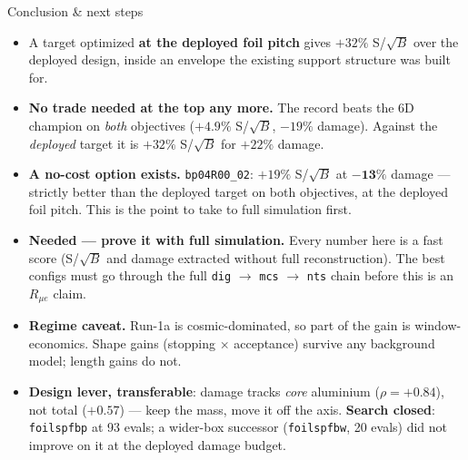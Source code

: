\documentclass[aspectratio=169,10pt]{beamer}
\begin{document}
\begin{frame}{Conclusion \& next steps}
\small
\begin{itemize}
  \item A target optimized \textbf{at the deployed foil pitch} gives $+32\%$ S/$\sqrt{B}$
        over the deployed design, inside an envelope the existing support structure was
        built for.
  \vspace{0.4em}
  \item \textbf{No trade needed at the top any more.} The record beats the 6D champion on
        \emph{both} objectives ($+4.9\%$ S/$\sqrt{B}$, $-19\%$ damage). Against the
        \emph{deployed} target it is $+32\%$ S/$\sqrt{B}$ for $+22\%$ damage.
  \vspace{0.4em}
  \item \textbf{A no-cost option exists.} \texttt{bp04R00\_02}: $+19\%$ S/$\sqrt{B}$ at
        $\mathbf{-13\%}$ damage --- strictly better than the deployed target on both
        objectives, at the deployed foil pitch. This is the point to take to full
        simulation first.
  \vspace{0.4em}
  \item \textbf{Needed --- prove it with full simulation.} Every number here is a fast score
        (S/$\sqrt{B}$ and damage extracted without full reconstruction). The best configs must
        go through the full \texttt{dig} $\rightarrow$ \texttt{mcs} $\rightarrow$ \texttt{nts}
        chain before this is an $R_{\mu e}$ claim.
  \vspace{0.4em}
  \item \textbf{Regime caveat.} Run-1a is cosmic-dominated, so part of the gain is
        window-economics. Shape gains (stopping $\times$ acceptance) survive any background
        model; length gains do not.
  \vspace{0.4em}
  \item \textbf{Design lever, transferable}: damage tracks \emph{core} aluminium
        ($\rho = +0.84$), not total ($+0.57$) --- keep the mass, move it off the axis.
        \textbf{Search closed}: \texttt{foilspfbp} at 93 evals; a wider-box successor
        (\texttt{foilspfbw}, 20 evals) did not improve on it at the deployed damage budget.
\end{itemize}
\end{frame}
\end{document}
